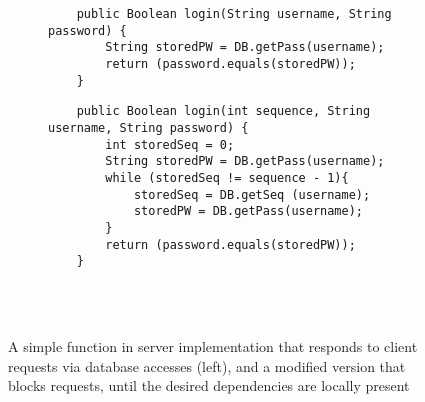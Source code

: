 \begin{figure}[t]
    \begin{subfigure}[t]{0.48\textwidth}
        \centering
	\begin{lstlisting}
	public Boolean login(String username, String password) {
		String storedPW = DB.getPass(username);
		return (password.equals(storedPW));
	}
	\end{lstlisting}
	\label{fig:modified_bb}
    \end{subfigure}
    \quad 
    \begin{subfigure}[t]{0.48\textwidth}
        \centering
	\begin{lstlisting}
	public Boolean login(int sequence, String username, String password) {
		int storedSeq = 0; 
		String storedPW = DB.getPass(username);
		while (storedSeq != sequence - 1){
			storedSeq = DB.getSeq (username);
			storedPW = DB.getPass(username);
		}
		return (password.equals(storedPW));
	}
	\end{lstlisting}
        \label{fig:simple_bb}
    \end{subfigure} 
    \\ \hrulefill \\
\caption{A simple function in server implementation that responds to client
requests via database accesses (left), and a modified version that blocks
requests, until the desired dependencies are locally present}
\label{fig:haskel_code}
\end{figure}




